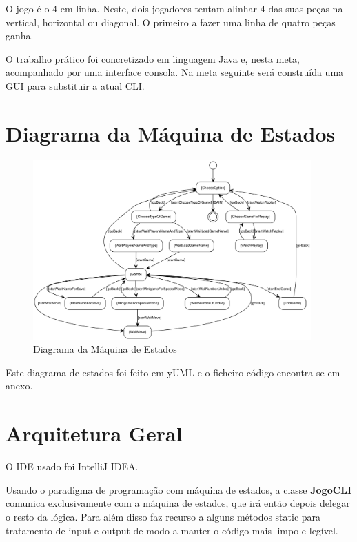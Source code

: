 \documentclass[11pt]{article}
\begin{document}
	O jogo é o 4 em linha. Neste, dois jogadores tentam alinhar 4 das suas peças na vertical, horizontal ou diagonal. O primeiro a fazer uma linha de quatro peças ganha.
	
	O trabalho prático foi concretizado em linguagem Java e, nesta meta, acompanhado por uma interface consola. Na meta seguinte será construída uma GUI para substituir a atual CLI.
   	
	
	\large
	\section{Diagrama da Máquina de Estados}
	\normalsize
	
	\begin{figure}[h]
		\includegraphics[width=0.95\textwidth,height=0.88\textheight,keepaspectratio]{state-machine-diagram}
		\centering
		\caption{Diagrama da Máquina de Estados}
		\label{fig:sm-diagram}
	\end{figure}
	
	Este diagrama de estados foi feito em yUML e o ficheiro código encontra-se em anexo.
	
	
	\large
	\section{Arquitetura Geral}
	\normalsize
	
	O IDE usado foi IntelliJ IDEA.
	
	Usando o paradigma de programação com máquina de estados, a classe \textbf{JogoCLI} comunica exclusivamente com a máquina de estados, que irá então depois delegar o resto da lógica. Para além disso faz recurso a alguns métodos static para tratamento de input e output de modo a manter o código mais limpo e legível.
	
\end{document}
